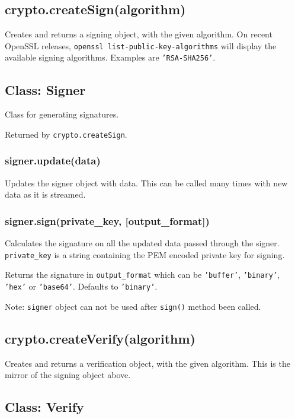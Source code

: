 \subsection{crypto.createSign(algorithm)}

Creates and returns a signing object, with the given algorithm. On
recent OpenSSL releases, \texttt{openssl list-public-key-algorithms}
will display the available signing algorithms. Examples are
\texttt{'RSA-SHA256'}.

\subsection{Class: Signer}

Class for generating signatures.

Returned by \texttt{crypto.createSign}.

\subsubsection{signer.update(data)}

Updates the signer object with data. This can be called many times with
new data as it is streamed.

\subsubsection{signer.sign(private\_key, {[}output\_format{]})}

Calculates the signature on all the updated data passed through the
signer. \texttt{private\_key} is a string containing the PEM encoded
private key for signing.

Returns the signature in \texttt{output\_format} which can be
\texttt{'buffer'}, \texttt{'binary'}, \texttt{'hex'} or
\texttt{'base64'}. Defaults to \texttt{'binary'}.

Note: \texttt{signer} object can not be used after \texttt{sign()}
method been called.

\subsection{crypto.createVerify(algorithm)}

Creates and returns a verification object, with the given algorithm.
This is the mirror of the signing object above.

\subsection{Class: Verify}

